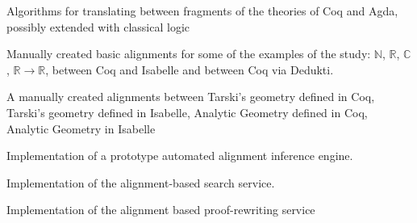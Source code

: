 \begin{workpackage}
\begin{wpdelivs}
  \begin{wpdeliv}[due=24,id=prooftheoretical,dissem=PU,nature=DEM,lead=Lee,task=alignlogic]
    {Algorithms for translating between fragments of the theories of
      Coq and Agda, possibly extended with classical logic}
  \end{wpdeliv}
  \begin{wpdeliv}[due=24,id=aligningnumbers,dissem=PU,nature=DEM,lead=Str,task=aligncasestudies]
    {Manually created basic alignments for some of the examples of the
      study: $\mathbb{N}$, $\mathbb{R}$, $\mathbb{C}$, $\mathbb{R}
      \rightarrow \mathbb{R}$, between Coq and Isabelle and between
      Coq via Dedukti.}
  \end{wpdeliv}
  \begin{wpdeliv}[due=36,id=aligninggeometries,dissem=PU,nature=DEM,lead=Bel,task=aligncasestudies]
    {A manually created alignments between Tarski's geometry defined
      in Coq, Tarski's geometry defined in Isabelle, Analytic Geometry
      defined in Coq, Analytic Geometry in Isabelle}
  \end{wpdeliv}
  \begin{wpdeliv}[due=48,id=automatedalignment,dissem=PU,nature=DEM,lead=Imt,task=aligntheories]
    {Implementation of a prototype automated alignment inference engine.}
  \end{wpdeliv}
  \begin{wpdeliv}[due=48,id=alignsearch,dissem=PU,nature=DEM,lead=Fau,task=alignsearch]
    {Implementation of the alignment-based search service.}
  \end{wpdeliv}
  \begin{wpdeliv}[due=48,id=alignproofrewr,dissem=PU,nature=DEM,lead=Bol,task=alignproofs]
    {Implementation of the alignment based proof-rewriting service}
  \end{wpdeliv}

\end{wpdelivs}
\end{workpackage}

